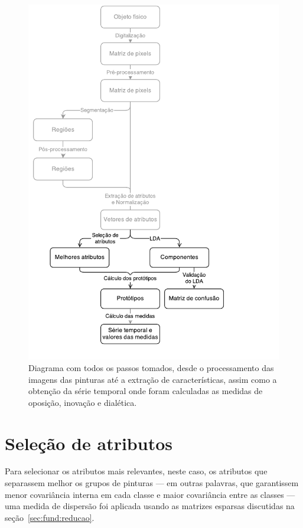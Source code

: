 \begin{figure}[h!]
\begin{center} 
          \caption{Diagrama com todos os passos tomados, desde o processamento das
        imagens das pinturas até a extração de características, assim como a
        obtenção da série temporal onde foram calculadas as medidas de oposição,
        inovação e dialética.}
        \label{fig:dataflow}
        \includegraphics[scale=.8]{figs/dataflow_pintores3}
        \fonteminha
\end{center}
\end{figure}
\clearpage
\section{Seleção de atributos}

Para selecionar os atributos mais relevantes, neste caso, os atributos
que separassem melhor os grupos de pinturas --- em outras palavras,
que garantissem menor covariância interna em cada classe e maior
covariância entre as classes --- uma medida de dispersão foi aplicada
usando as matrizes esparsas discutidas na
seção~\ref{sec:fund:reducao}.

